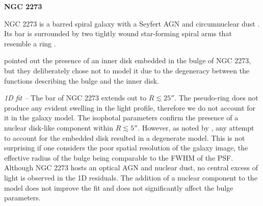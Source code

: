 \documentclass[preprint2]{emulateapj}
\begin{document}
  \clearpage\newpage\noindent
  {\bf NGC 2273 \\}

  NGC 2273 is a barred spiral galaxy with a Seyfert AGN \citep{contini1998} 
  and circumnuclear dust \citep{simoeslopes2007}. 
  Its bar is surrounded by two tightly wound star-forming spiral arms that resemble a ring
  \citep{comeron2010}. 

  \cite{laurikainen2005} pointed out the presence of an inner disk embedded in the bulge of NGC 2273,
  but they deliberately chose not to model it due to the degeneracy between the functions describing the bulge
  and the inner disk. 

  \emph{1D fit -- }
  The bar of NGC 2273 extends out to $R \lesssim 25''$. 
  The pseudo-ring does not produce any evident swelling in the light profile, 
  therefore we do not account for it in the galaxy model.
  The isophotal parameters confirm the presence of a nuclear disk-like component within $R \lesssim 5''$.
  However, as noted by \cite{laurikainen2005}, any attempt to account for the embedded disk resulted in a 
  degenerate model. 
  This is not surprising if one considers the poor spatial resolution of the galaxy image, 
  the effective radius of the bulge being comparable to the FWHM of the PSF.
  Although NGC 2273 hosts an optical AGN and nuclear dust, no central excess of light is observed in the 1D residuals.
  The addition of a nuclear component to the model does not improve the fit and does not significantly affect
  the bulge parameters.
\end{document}
